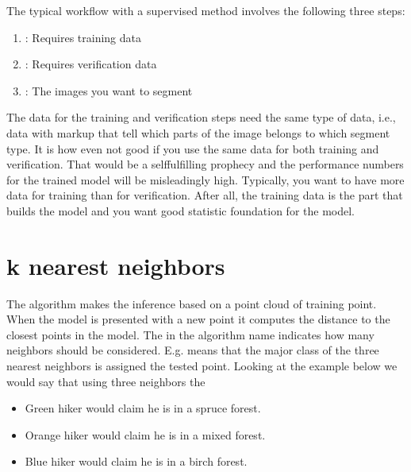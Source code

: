 \documentclass[letterpaper,10pt,english]{sphinxmanual}
\begin{document}
The typical workflow with a supervised method involves the following three steps:
\begin{enumerate}
%
\item {} 
: Requires training data

\item {} 
: Requires verification data

\item {} 
: The images you want to segment

\end{enumerate}

The data for the training and verification steps need the same type of data, i.e., data with markup that tell which parts of the image belongs to which segment type. It is how even not good if you use the same data for both training and verification. That would be a self\sphinxhyphen{}fulfilling prophecy and the performance numbers for the trained model will be misleadingly high. Typically, you want to have more data for training than for verification. After all, the training data is the part that builds the model and you want good statistic foundation for the model.


\section{k nearest neighbors}
\label{\detokenize{ML4NeutronImageSegmentation:k-nearest-neighbors}}
The  algorithm makes the inference based on a point cloud of training point. When the model is presented with a new point it computes the distance to the closest points in the model. The  in the algorithm name indicates how many neighbors should be considered. E.g.  means that the major class of the three nearest neighbors is assigned the tested point. Looking at the example below we would say that using three neighbors the
\begin{itemize}
\item {} 
Green hiker would claim he is in a spruce forest.

\item {} 
Orange hiker would claim he is in a mixed forest.

\item {} 
Blue hiker would claim he is in a birch forest.

\end{itemize}
\end{document}
